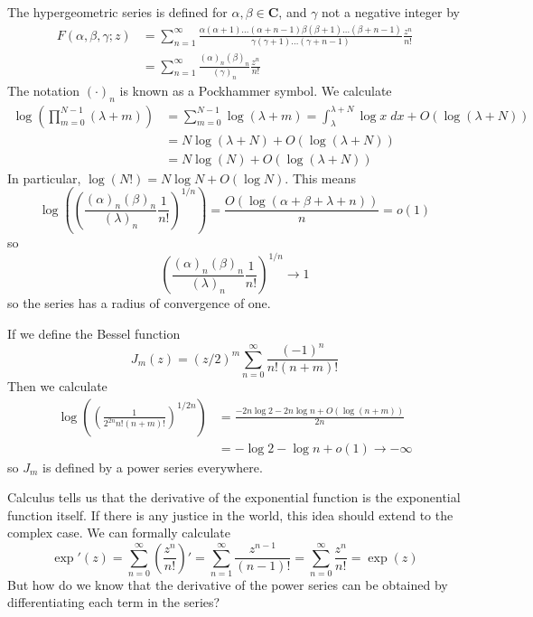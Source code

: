 \begin{example}
    The hypergeometric series is defined for $\alpha, \beta \in \mathbf{C}$, and $\gamma$ not a negative integer by
    \begin{align*}
        F(\alpha,\beta,\gamma;z) &= \sum_{n = 1}^\infty \frac{\alpha(\alpha+1)\dots(\alpha + n - 1) \beta(\beta + 1) \dots (\beta + n - 1)}{\gamma (\gamma + 1) \dots (\gamma + n - 1)} \frac{z^n}{n!}\\
        &= \sum_{n = 1}^\infty \frac{(\alpha)_n (\beta)_n}{(\gamma)_n} \frac{z^n}{n!}
    \end{align*}
    The notation $(\cdot)_n$ is known as a Pockhammer symbol. We calculate
    \begin{align*}
        \log \left( \prod_{m = 0}^{N-1} (\lambda + m) \right) &= \sum_{m = 0}^{N-1} \log(\lambda + m) = \int_\lambda^{\lambda + N} \log x\; dx + O(\log(\lambda + N))\\
        &= N \log(\lambda + N) + O(\log(\lambda + N))\\
        &= N \log(N) + O(\log(\lambda + N))
    \end{align*}
    In particular, $\log(N!) = N \log N + O(\log N)$. This means
    \[ \log \left( \left( \frac{(\alpha)_n (\beta)_n}{(\lambda)_n} \frac{1}{n!} \right)^{1/n} \right) = \frac{O(\log(\alpha + \beta + \lambda + n))}{n} = o(1) \]
    so
    \[ \left( \frac{(\alpha)_n (\beta)_n}{(\lambda)_n} \frac{1}{n!} \right)^{1/n} \to 1 \]
    so the series has a radius of convergence of one.
\end{example}

\begin{example}
    If we define the Bessel function
    \[ J_m(z) = (z/2)^m \sum_{n = 0}^\infty \frac{(-1)^n}{n! (n+m)!} \]
    Then we calculate
    \begin{align*}
        \log \left( \left( \frac{1}{2^{2n} n! (n+m)!} \right)^{1/2n} \right) &= \frac{-2n \log 2 - 2n \log n + O(\log(n+m))}{2n}\\
        &= - \log 2 - \log n + o(1) \to -\infty
    \end{align*}
    so $J_m$ is defined by a power series everywhere.
\end{example}

Calculus tells us that the derivative of the exponential function is the exponential function itself. If there is any justice in the world, this idea should extend to the complex case. We can formally calculate
%
\[ \exp'(z) = \sum_{n = 0}^\infty \left( \frac{z^n}{n!} \right)' = \sum_{n = 1}^\infty \frac{z^{n-1}}{(n-1)!} = \sum_{n = 0}^\infty \frac{z^n}{n!} = \exp(z) \]
%
But how do we know that the derivative of the power series can be obtained by differentiating each term in the series?


